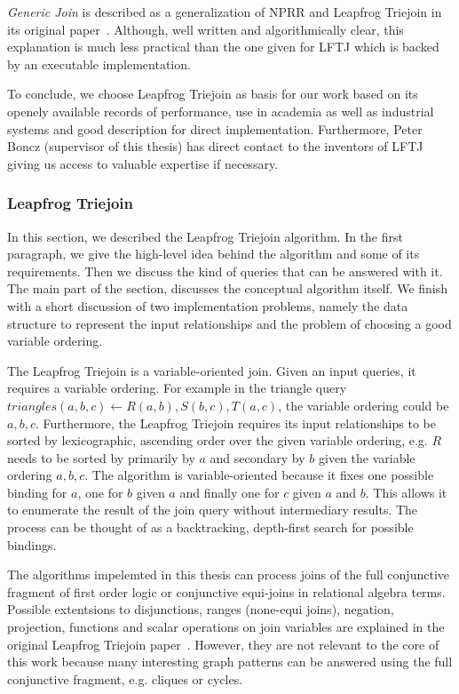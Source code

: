 \textit{Generic Join} is described as a generalization of \textsc{NPRR} and Leapfrog Triejoin in its original
paper~\cite{skew-strikes-back}.
Although, well written and algorithmically clear, this explanation is much less practical than the one given for \textsc{LFTJ} which
is backed by an executable implementation.

To conclude, we choose Leapfrog Triejoin as basis for our work based on its openely available records of performance, use in
academia as well as industrial systems and good description for direct implementation.
Furthermore, Peter Boncz (supervisor of this thesis) has direct contact to the inventors of \textsc{LFTJ} giving us access to valuable
expertise if necessary.

\subsubsection{Leapfrog Triejoin} \label{subsubsec:leapfrog-triejoin}
In this section, we described the Leapfrog Triejoin algorithm.
In the first paragraph, we give the high-level idea behind the algorithm and some of its requirements.
Then we discuss the kind of queries that can be answered with it.
The main part of the section, discusses the conceptual algorithm itself.
We finish with a short discussion of two implementation problems, namely the data structure to represent the input relationships and
the problem of choosing a good variable ordering.

The Leapfrog Triejoin is a variable-oriented join.
Given an input queries, it requires a variable ordering.
For example in the triangle query $triangles(a, b, c) \leftarrow R(a, b), S(b, c), T(a, c)$,
the variable ordering could be $a, b, c$.
Furthermore, the Leapfrog Triejoin requires its input relationships to be sorted by lexicographic, ascending order over the given
variable ordering, e.g. $R$ needs to be sorted by primarily by $a$ and secondary by $b$ given the variable ordering $a, b, c$.
The algorithm is variable-oriented because it fixes one possible binding for $a$, one for $b$ given $a$ and finally one for $c$ given $a$
and $b$.
This allows it to enumerate the result of the join query without intermediary results.
The process can be thought of as a backtracking, depth-first search for possible bindings.

The algorithms impelemted in this thesis can process joins of the full conjunctive fragment of first order logic or conjunctive
equi-joins in relational algebra terms.
Possible extentsions to disjunctions, ranges (none-equi joins), negation, projection, functions and scalar operations on join variables are
explained in the original Leapfrog Triejoin paper~\cite{lftj}.
However, they are not relevant to the core of this work because many interesting graph patterns can be answered using the full conjunctive
fragment, e.g. cliques or cycles.

